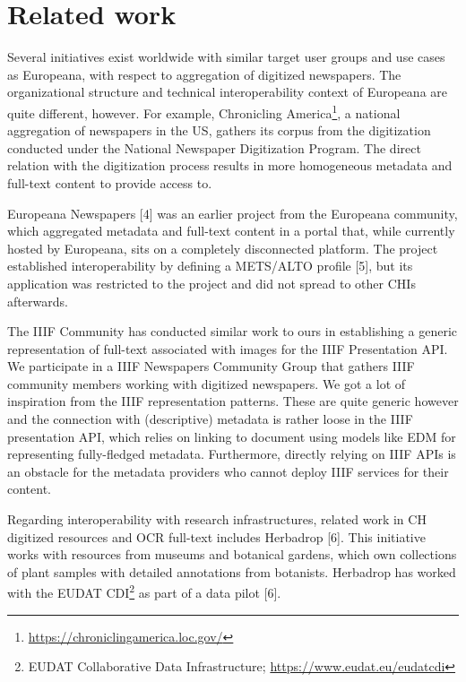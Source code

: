 \documentclass[a4paper,UKenglish,cleveref, autoref]{oasics-v2019}
\begin{document}
\section{Related work}
\label{sec:relatedwork}

Several initiatives exist worldwide with similar target user groups and use cases as Europeana, with respect to aggregation of digitized newspapers. The organizational structure and technical interoperability context of Europeana are quite different, however. For example, Chronicling 
America\footnote{\url{https://chroniclingamerica.loc.gov/}}, a national aggregation of newspapers in the US, gathers its corpus from the digitization conducted under the National Newspaper Digitization Program. The direct relation with the digitization process results in more homogeneous metadata and full-text content to provide access to.

Europeana Newspapers [4] was an earlier project from the Europeana community, which aggregated metadata and full-text content in a portal that, while currently hosted by Europeana, sits on a completely disconnected platform. The project established interoperability by defining a METS/ALTO profile [5], but its application was restricted to the project and did not spread to other CHIs afterwards.

The IIIF Community has conducted similar work to ours in establishing a generic representation of full-text associated with images for the IIIF Presentation API. We participate in a IIIF Newspapers Community Group that gathers IIIF community members working with digitized newspapers. We got a lot of inspiration from the IIIF representation patterns. These are quite generic however and the connection with (descriptive) metadata is rather loose in the IIIF presentation API, which relies on linking to document using models like EDM for representing fully-fledged metadata. Furthermore, directly relying on IIIF APIs is an obstacle for the metadata providers who cannot deploy IIIF services for their content.

Regarding interoperability with research infrastructures, related work in CH digitized resources and OCR full-text includes Herbadrop [6]. This initiative works with resources from museums and botanical gardens, which own collections of plant samples with detailed annotations from botanists. Herbadrop has worked with the EUDAT 
CDI\footnote{EUDAT Collaborative Data Infrastructure; \url{https://www.eudat.eu/eudatcdi}}
as part of a data pilot [6]. 
\end{document}
